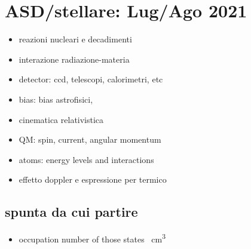 \documentclass[main.tex]{subfiles}
\begin{document}
\part{ASD/stellare: Lug/Ago 2021}

\begin{itemize}
    \item reazioni nucleari e decadimenti
    \item interazione radiazione-materia
    \item detector: ccd, telescopi, calorimetri, etc
    \item bias: bias astrofisici,
    \item cinematica relativistica
    \item QM: spin, current, angular momentum
    \item atoms: energy levels and interactions
\item effetto doppler e espressione per termico

\end{itemize}

\chapter{spunta da cui partire}
\begin{itemize}
\item occupation number of those states \si{\per\cubic\cm}
\end{itemize}
\end{document}

